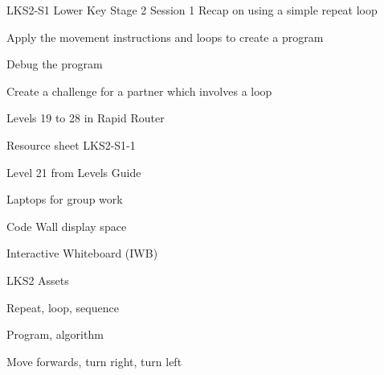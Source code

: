\documentclass{../../../lessonplan}
\begin{document}
\lessonplantitle
    {LKS2-S1}
    {Lower Key Stage 2 Session 1}
    {Recap on using a simple repeat loop}

\preamble
    {
    \item Apply the movement instructions and  loops to create a program
    \item Debug the program
    \item Create a challenge for a partner which involves a  loop
    }
    {
    \item Levels 19 to 28 in Rapid Router
    \item Resource sheet LKS2-S1-1
    \item Level 21 from Levels Guide
    \item Laptops for group work
    \item Code Wall display space
    \item Interactive Whiteboard (IWB)
    \item LKS2 Assets
    }
    {
    \item Repeat, loop, sequence
    \item Program, algorithm
    \item Move forwards, turn right, turn left
    }
\end{document}
